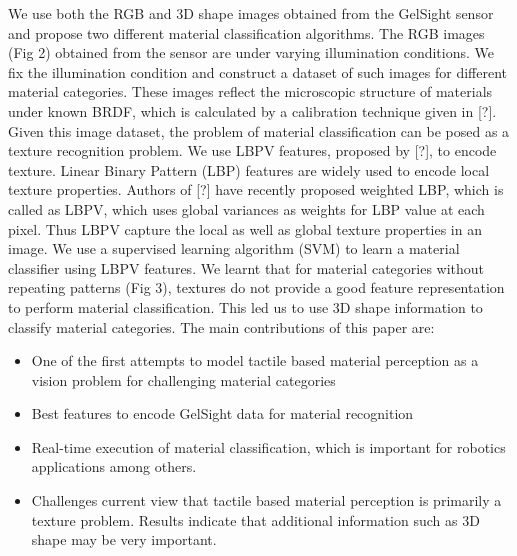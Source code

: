 \documentclass[10pt,twocolumn,letterpaper]{article}
\begin{document}
We use both the RGB and 3D shape images obtained from the GelSight sensor and propose two different material classification algorithms. The RGB images (Fig 2) obtained
from the sensor are under varying illumination conditions. We fix the illumination condition and construct a dataset of such images for different material categories.
These images reflect the microscopic structure of materials under known BRDF, which is calculated by a calibration technique given in [?]. Given this image dataset,
the problem of material classification can be posed as a texture recognition problem. We use LBPV features, proposed by [?], to encode texture. Linear Binary Pattern 
(LBP) features are widely used to encode local texture properties. Authors of [?] have recently proposed weighted LBP, which is called as LBPV, which uses global variances
as weights for LBP value at each pixel. Thus LBPV capture the local as well as global texture properties in an image. We use a supervised learning algorithm (SVM) to
learn a material classifier using LBPV features. We learnt that for material categories without repeating patterns (Fig 3), textures do not provide a 
good feature representation to perform material classification. This led us to use 3D shape information to classify material categories. The main contributions of 
this paper are: 
\begin{itemize}
\item One of the first attempts to model tactile based material perception as a vision problem for challenging material categories
\item Best features to encode GelSight data for material recognition
\item Real-time execution of material classification, which is important for robotics applications among others. 
\item Challenges current view that tactile based material perception is primarily a texture problem. Results indicate that additional information
such as 3D shape may be very important.
\end{itemize}

\end{document}
